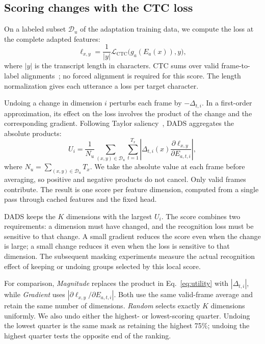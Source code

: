 \documentclass{article}
\newcommand{\CTC}{\mathrm{CTC}}
\newcommand{\Du}{\mathcal{D}_{u}}
\begin{document}
\subsection{Scoring changes with the CTC loss}
On a labeled subset $\Du$ of the adaptation training data, we compute the loss at the complete adapted features:
\begin{equation}
 \ell_{x,y}=\frac{1}{|y|}\mathcal{L}_{\CTC}\bigl(g_a(E_a(x)),y\bigr),
 \label{eq:loss}
\end{equation}
where $|y|$ is the transcript length in characters. CTC sums over valid frame-to-label alignments~\cite{graves2006ctc}; no forced alignment is required for this score. The length normalization gives each utterance a loss per target character.

Undoing a change in dimension $i$ perturbs each frame by $-\Delta_{t,i}$. In a first-order approximation, its effect on the loss involves the product of the change and the corresponding gradient. Following Taylor saliency~\cite{molchanov2017pruning}, DADS aggregates the absolute products:
\begin{equation}
 U_i=\frac{1}{N_u}\sum_{(x,y)\in\Du}\sum_{t=1}^{T_x}
 \left|\Delta_{t,i}(x)\frac{\partial\ell_{x,y}}{\partial E_{a,t,i}}\right|,
 \label{eq:utility}
\end{equation}
where $N_u=\sum_{(x,y)\in\Du}T_x$. We take the absolute value at each frame before averaging, so positive and negative products do not cancel. Only valid frames contribute. The result is one score per feature dimension, computed from a single pass through cached features and the fixed head.

DADS keeps the $K$ dimensions with the largest $U_i$. The score combines two requirements: a dimension must have changed, and the recognition loss must be sensitive to that change. A small gradient reduces the score even when the change is large; a small change reduces it even when the loss is sensitive to that dimension. The subsequent masking experiments measure the actual recognition effect of keeping or undoing groups selected by this local score.

For comparison, \emph{Magnitude} replaces the product in Eq.~\eqref{eq:utility} with $|\Delta_{t,i}|$, while \emph{Gradient} uses $|\partial\ell_{x,y}/\partial E_{a,t,i}|$. Both use the same valid-frame average and retain the same number of dimensions. \emph{Random} selects exactly $K$ dimensions uniformly. We also undo either the highest- or lowest-scoring quarter. Undoing the lowest quarter is the same mask as retaining the highest 75\%; undoing the highest quarter tests the opposite end of the ranking.
\end{document}
